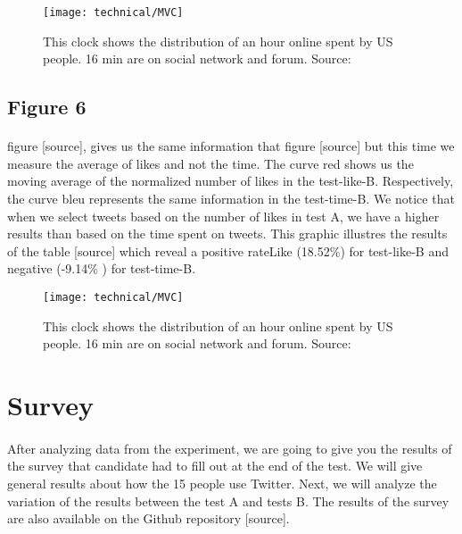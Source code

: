\begin{figure}[h] 
\centering 
\texttt{[image: technical/MVC]} 
\caption[Time spent of Social Media]{This clock shows the distribution of an hour online spent by US people. 16 min are on social network and forum. Source: \cite{s_clock}}
\label{fig:tinder} 
\end{figure}

\subsection{Figure 6}

\paragraph{}
figure [source], gives us the same information that figure [source] but this time we measure the average of likes and not the time. The curve red shows us the moving average of the normalized number of likes in the test-like-B. Respectively, the curve bleu represents the same information in the test-time-B.
We notice that when we select tweets based on the number of likes in test A, we have a higher results than based on the time spent on tweets. This graphic illustres the results of the table [source] which reveal a positive rateLike (18.52\%) for test-like-B and negative (-9.14\% ) for test-time-B.

\begin{figure}[h] 
\centering 
\texttt{[image: technical/MVC]} 
\caption[Time spent of Social Media]{This clock shows the distribution of an hour online spent by US people. 16 min are on social network and forum. Source: \cite{s_clock}}
\label{fig:tinder} 
\end{figure}

\section{Survey}

\paragraph{}
After analyzing data from the experiment, we are going to give you the results of the survey that candidate had to fill out at the end of the test. We will give general results about how the 15 people use Twitter. Next, we will analyze the variation of the results between the test A and tests B. The results of the survey are also available on the Github repository [source].

